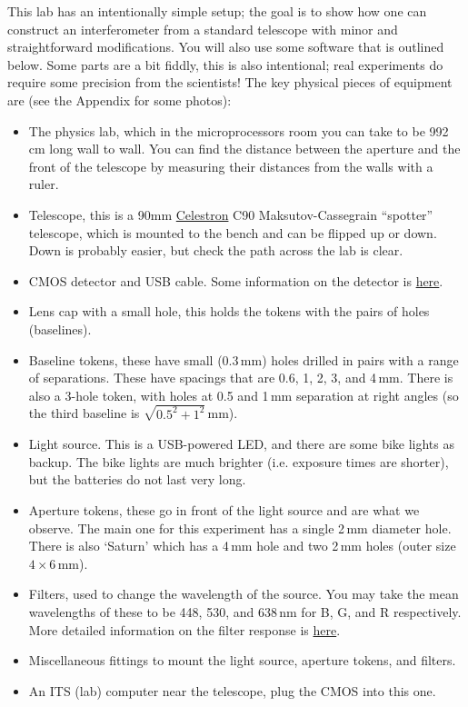 \documentclass[11pt]{article}
\begin{document}
This lab has an intentionally simple setup; the goal is to show how one can construct an interferometer from a standard telescope with minor and straightforward modifications. You will also use some software that is outlined below. Some parts are a bit fiddly, this is also intentional; real experiments do require some precision from the scientists! The key physical pieces of equipment are (see the Appendix for some photos):
\begin{itemize}
    \item The physics lab, which in the microprocessors room you can take to be 992\,cm long wall to wall. You can find the distance between the aperture and the front of the telescope by measuring their distances from the walls with a ruler.
    \item Telescope, this is a 90mm \href{https://www.celestron.com/products/c90-mak-spotting-scope#description}{Celestron} C90 Maksutov-Cassegrain ``spotter'' telescope, which is mounted to the bench and can be flipped up or down. Down is probably easier, but check the path across the lab is clear.
    \item CMOS detector and USB cable. Some information on the detector is \href{https://www.qhyccd.com/qhy5l-ii-planetary-guiding-camera/}{here}.
    \item Lens cap with a small hole, this holds the tokens with the pairs of holes (baselines).
    \item Baseline tokens, these have small (0.3\,mm) holes drilled in pairs with a range of separations. These have spacings that are 0.6, 1, 2, 3, and 4\,mm. There is also a 3-hole token, with holes at 0.5 and 1\,mm separation at right angles (so the third baseline is $\sqrt{0.5^2 + 1^2}$\,mm).
    \item Light source. This is a USB-powered LED, and there are some bike lights as backup. The bike lights are much brighter (i.e. exposure times are shorter), but the batteries do not last very long.
    \item Aperture tokens, these go in front of the light source and are what we observe. The main one for this experiment has a single 2\,mm diameter hole. There is also `Saturn' which has a 4\,mm hole and two 2\,mm holes (outer size $4 \times 6$\,mm).
    \item Filters, used to change the wavelength of the source. You may take the mean wavelengths of these to be 448, 530, and 638\,nm for B, G, and R respectively. More detailed information on the filter response is \href{https://www.firstlightoptics.com/rgb-filters-filter-sets/zwo-2-lrgb-filter-set.html}{here}.
    \item Miscellaneous fittings to mount the light source, aperture tokens, and filters.
    \item An ITS (lab) computer near the telescope, plug the CMOS into this one.
\end{itemize}
\end{document}
